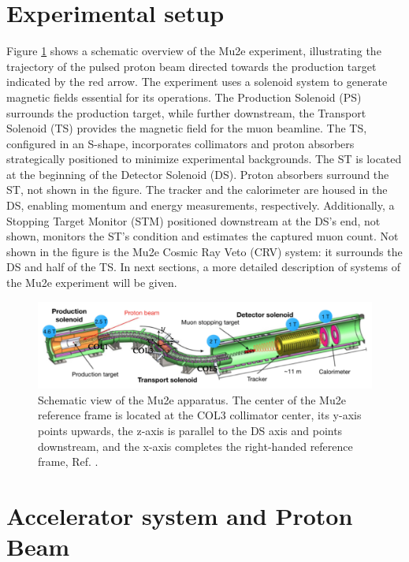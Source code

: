 \section{Experimental setup}\label{setup}
Figure \ref{fig:mu2escheme} shows a schematic overview of the Mu2e experiment, illustrating the trajectory of the pulsed proton beam directed towards the production target indicated by the red arrow. The experiment uses a solenoid system to generate magnetic fields essential for its operations. The Production Solenoid (PS) surrounds the production target, while further downstream, the Transport Solenoid (TS) provides the magnetic field for the muon beamline. The TS, configured in an S-shape, incorporates collimators and proton absorbers strategically positioned to minimize experimental backgrounds. The ST is located at the beginning of the Detector Solenoid (DS). Proton absorbers surround the ST, not shown in the figure. The tracker and the calorimeter are housed in the DS, enabling momentum and energy measurements, respectively. 
Additionally, a Stopping Target Monitor (STM) positioned downstream at the DS's end, not shown, monitors the ST's condition and estimates the captured muon count. Not shown in the figure is the Mu2e Cosmic Ray Veto (CRV) system: it surrounds the DS and half of the TS. In next sections, a more detailed description of systems of the Mu2e experiment will be given.
\begin{figure}[!h]
\centering
\includegraphics[width =\textwidth]{figures/png/Screenshot_20240301_143105.png}
\caption[The Mu2e apparatus.]{Schematic view of the Mu2e apparatus. The center of the Mu2e reference frame is located at the COL3 collimator center, its y-axis points upwards, the z-axis is parallel to the DS axis and points downstream, and the x-axis completes the right-handed reference frame, Ref. \cite{universe9010054}.}
\label{fig:mu2escheme}
\end{figure}
\section{Accelerator system and Proton Beam}\label{accel}
